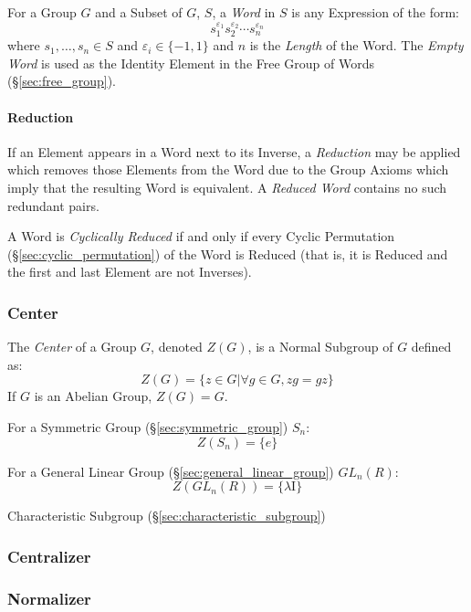 For a Group $G$ and a Subset of $G$, $S$, a \emph{Word} in $S$ is any
Expression of the form:
\[
    s_1^{\varepsilon_1}s_2^{\varepsilon_2} \cdots s_n^{\varepsilon_n}
\]
where $s_1,\ldots,s_n \in S$ and $\varepsilon_i \in \{-1, 1\}$ and $n$
is the \emph{Length} of the Word. The \emph{Empty Word} is used as the
Identity Element in the Free Group of Words (\S\ref{sec:free_group}).



\paragraph{Reduction}\label{sec:word_reduction}\hfill

If an Element appears in a Word next to its Inverse, a
\emph{Reduction} may be applied which removes those Elements from the
Word due to the Group Axioms which imply that the resulting Word is
equivalent. A \emph{Reduced Word} contains no such redundant pairs.

A Word is \emph{Cyclically Reduced} if and only if every Cyclic
Permutation (\S\ref{sec:cyclic_permutation}) of the Word is Reduced
(that is, it is Reduced and the first and last Element are not
Inverses).



\subsubsection{Center}\label{sec:group_center}

The \emph{Center} of a Group $G$, denoted $Z(G)$, is a Normal Subgroup
of $G$ defined as:
\[
    Z(G) = \{ z \in G | \forall g \in G, zg = gz \}
\]
If $G$ is an Abelian Group, $Z(G) = G$.

For a Symmetric Group (\S\ref{sec:symmetric_group}) $S_n$:
\[
    Z(S_n) = \{e\}
\]

For a General Linear Group (\S\ref{sec:general_linear_group})
$GL_n(R)$:
\[
    Z(GL_n(R)) = \{\lambda \mathrm{I}\}
\]

Characteristic Subgroup (\S\ref{sec:characteristic_subgroup})



\subsubsection{Centralizer}\label{sec:group_centralizer}

\subsubsection{Normalizer}\label{sec:group_normalizer}


